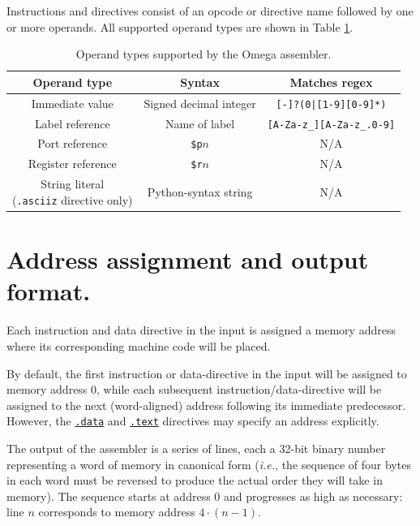 \documentclass[12pt,english,twoside]{report}
\def\code{\texttt}
\begin{document}
Instructions and directives consist of an opcode or directive name
followed by one or more operands. All supported operand types are shown
in Table \ref{tab:AssemblerOperands}.

\begin{table}[h]
  \begin{center}
\begin{tabular}{c|c|c}
  \textbf{Operand type} & \textbf{Syntax} & \textbf{Matches regex}\\
  \hline
  Immediate value & Signed decimal integer & \code{[-]?(0|[1-9][0-9]*)}\\
  \hline
  Label reference & Name of label & \code{[A-Za-z\_][A-Za-z\_.0-9]}\\
  \hline
  Port reference & \code{\$p}$n$ & N/A \\
  \hline
  Register reference & \code{\$r}$n$ & N/A \\
  \hline
  \makecell{String literal\\ (\code{.asciiz} directive only)} & Python-syntax string & N/A\\
  \hline
\end{tabular}
\caption{\label{tab:AssemblerOperands} Operand types supported by the Omega assembler.}
  \end{center}
\end{table}

\section{\label{sec:AddressAssignment} Address assignment and output format.}

Each instruction and data directive in the input is assigned a memory
address where its corresponding machine code will be placed.

By default, the first instruction or data-directive in the input will
be assigned to memory address 0, while each subsequent
instruction/data-directive will be assigned to the next (word-aligned)
address following its immediate predecessor. However, the
\hyperref[Asm_data]{\code{.data}} and
\hyperref[Asm_text]{\code{.text}} directives may specify an address
explicitly.

The output of the assembler is a series of lines, each a 32-bit binary
number representing a word of memory in canonical form (\emph{i.e.},
the sequence of four bytes in each word must be reversed to produce
the actual order they will take in memory). The sequence starts at
address 0 and progresses as high as necessary: line $n$ corresponds to
memory address $4\cdot(n-1)$.
\end{document}
